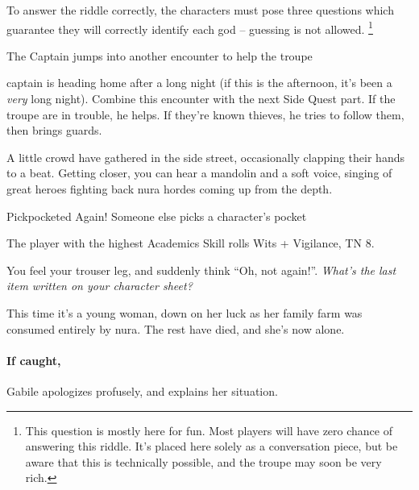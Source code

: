 To answer the riddle correctly, the characters must pose three questions which guarantee they will correctly identify each god -- guessing is not allowed.
\footnote{This question is mostly here for fun.  Most players will have zero chance of answering this riddle.
It's placed here solely as a conversation piece, but be aware that this is technically possible, and the troupe may soon be very rich.}

{\squash The Captain}%
{ jumps into another encounter to help the troupe}%

\Gls{captain} is heading home after a long night (if this is the afternoon, it's been a \emph{very} long night).
Combine this encounter with the next Side Quest part.
If the troupe are in trouble, he helps.
If they're known thieves, he tries to follow them, then brings guards.

\captain

\begin{boxtext}
  A little crowd have gathered in the side street, occasionally clapping their hands to a beat.
  Getting closer, you can hear a mandolin and a soft voice, singing of great heroes fighting back nura hordes coming up from the depth.
\end{boxtext}

{Pickpocketed Again!}%
{Someone else picks a character's pocket}%

The player with the highest Academics Skill rolls Wits + Vigilance, TN 8.

\begin{boxtext}

  You feel your trouser leg, and suddenly think ``Oh, not again!''.  \textit{What's the last item written on your character sheet?}

\end{boxtext}

This time it's a young woman, down on her luck as her family farm was consumed entirely by nura.
The rest have died, and she's now alone.

\paragraph{If caught,}
Gabile apologizes profusely, and explains her situation.


